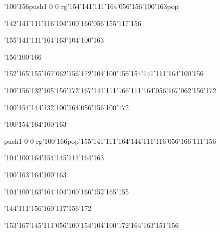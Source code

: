 \null\vfill\ipa\centerline{\enskip\enskip\enskip\enskip\enskip\enskip\enskip\enskip\char'100\char'156\enskip\pdfcolorstack\match push{1 0 0 rg}\char'154\char'141\char'111\char'164\char'056\char'156\char'100\char'163\pdfcolorstack\match pop{}}\medskip\centerline{\enskip\enskip\enskip\enskip\char'142\char'141\char'111\char'116\enskip\char'104\char'100\char'166\char'056\char'155\char'117\char'156}\medskip\centerline{\enskip\enskip\enskip\enskip\enskip\enskip\char'155\char'141\char'111\char'164\char'163\enskip\enskip\enskip\enskip\char'104\char'100\char'163}\medskip\centerline{\enskip\enskip\enskip\enskip\enskip\enskip\enskip\enskip\enskip\enskip\enskip\char'156\char'100\char'166}\medskip\centerline{\enskip\char'152\char'165\char'155\enskip\char'167\char'062\char'156\char'172\enskip\enskip\char'104\char'100\char'156\enskip\char'154\char'141\char'111\enskip\enskip\enskip\char'164\char'100\char'156}\medskip\centerline{\enskip\char'100\char'156\enskip\enskip\enskip\enskip\char'132\char'105\char'156\char'172\enskip\char'167\char'141\char'111\enskip\char'166\char'111\char'164\char'056\char'167\char'062\char'156\char'172}\medskip\centerline{\enskip\enskip\enskip\enskip\enskip\enskip\enskip\enskip\char'100\char'154\enskip\enskip\enskip\char'144\char'132\char'100\char'164\char'056\char'156\char'100\char'172\enskip\enskip\enskip\enskip\enskip}\medskip\vfill\footline{\hfil\tt\folio\hfil}\eject
\null\vfill\ipa\centerline{\enskip\enskip\enskip\enskip\enskip\enskip\enskip\enskip\char'100\char'154\enskip\enskip\enskip\enskip\enskip\char'164\char'100\char'163}\medskip\centerline{\enskip\pdfcolorstack\match push{1 0 0 rg}\char'100\char'166\pdfcolorstack\match pop{}\enskip\char'155\char'141\char'111\char'164\enskip\char'144\char'111\char'116\char'056\char'166\char'111\char'156}\medskip\centerline{\enskip\enskip\char'104\char'100\char'164\enskip\enskip\char'154\char'145\char'111\char'164\char'163\enskip\enskip\enskip\enskip\enskip\enskip\enskip}\medskip\centerline{\enskip\char'100\char'163\enskip\enskip\enskip\enskip\enskip\enskip\enskip\enskip\char'164\char'100\char'163}\medskip\centerline{\enskip\enskip\enskip\enskip\enskip\char'104\char'100\char'163\char'164\enskip\enskip\char'104\char'100\char'166\enskip\enskip\enskip\enskip\enskip\enskip\enskip\char'152\char'165\char'155}\medskip\centerline{\enskip\enskip\enskip\enskip\char'144\char'111\char'156\enskip\enskip\enskip\enskip\enskip\enskip\enskip\enskip\enskip\enskip\enskip\enskip\enskip\char'160\char'117\char'156\char'172}\medskip\centerline{\enskip\char'153\char'167\char'145\char'111\char'056\char'100\char'154\enskip\enskip\enskip\enskip\enskip\enskip\enskip\enskip\enskip\enskip\char'104\char'100\char'172\enskip\char'164\char'163\char'151\char'156}\medskip\vfill\footline{\hfil\tt\folio\hfil}\eject
